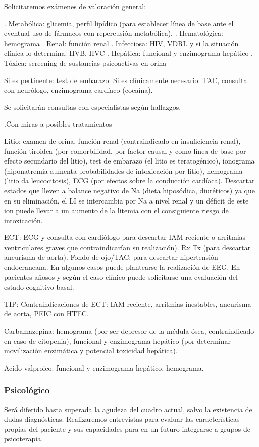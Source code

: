 Solicitaremos exámenes de valoración general:

. Metabólica: glicemia, perfil lipídico (para establecer línea de base ante el eventual uso de fármacos con repercusión metabólica).
. Hematológica: hemograma
. Renal: función renal
. Infecciosa: HIV, VDRL y si la situación clínica lo determina: HVB, HVC
. Hepática: funcional y enzimograma hepático
. Tóxica: screening de sustancias psicoactivas en orina

Si es pertinente: test de embarazo.
Si es clínicamente necesario: TAC, consulta con neurólogo, enzimograma cardíaco (cocaína).

Se solicitarán consultas con especialistas según hallazgos.

.Con miras a posibles tratamientos

Litio: examen de orina, función renal (contraindicado en insuficiencia renal), función tiroidea (por comorbilidad, por factor causal y como línea de base por efecto secundario del litio), test de embarazo (el litio es teratogénico), ionograma (hiponatremia aumenta probabilidades de intoxicación por litio), hemograma (litio da leucocitosis), ECG (por efectos sobre la conducción cardíaca). Descartar estados que lleven a balance negativo de Na (dieta hiposódica, diuréticos) ya que en su eliminación, el LI se intercambia por Na a nivel renal y un déficit de este ion puede llevar a un aumento de la litemia con el consiguiente riesgo de intoxicación.

ECT: ECG y consulta con cardiólogo para descartar IAM reciente o arritmias ventriculares graves que contraindicarían su realización). Rx Tx (para descartar aneurisma de aorta). Fondo de ojo/TAC: para descartar hipertensión endocraneana. En algunos casos puede plantearse la realización de EEG. En pacientes añosos y según el caso clínico puede solicitarse una evaluación del estado cognitivo basal.

TIP: Contraindicaciones de ECT: IAM reciente, arritmias inestables, aneurisma de aorta, PEIC con HTEC.

Carbamazepina: hemograma (por ser depresor de la médula ósea, contraindicado en caso de citopenia), funcional y enzimograma hepático (por determinar movilización enzimática y potencial toxicidad hepática).

Acido valproico: funcional y enzimograma hepático, hemograma.
\subsubsection*{Psicológico}
Será diferido hasta superada la agudeza del cuadro actual, salvo la existencia de dudas diagnósticas. Realizaremos entrevistas para evaluar las características propias del paciente y sus capacidades para en un futuro integrarse a grupos de psicoterapia.

